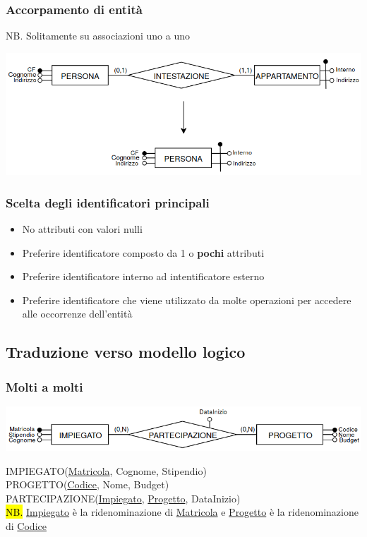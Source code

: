 \documentclass[a4paper]{article}
\begin{document}
\subsubsection{Accorpamento di entità}
NB. Solitamente su associazioni uno a uno
\begin{center}
      \includegraphics[scale=0.44]{img/pl7.png}
\end{center}

\subsubsection{Scelta degli identificatori principali}
\begin{itemize}[noitemsep]
  \item No attributi con valori nulli
  \item Preferire identificatore composto da 1 o \textbf{pochi} attributi
  \item Preferire identificatore interno ad intentificatore esterno
  \item Preferire identificatore che viene utilizzato da molte operazioni per accedere alle occorrenze dell'entità
\end{itemize}

\subsection{Traduzione verso modello logico}
\subsubsection{Molti a molti}
\begin{center}
      \includegraphics[scale=0.44]{img/pl8.png}
\end{center}
%
IMPIEGATO(\underline{Matricola}, Cognome, Stipendio)\\
PROGETTO(\underline{Codice}, Nome, Budget)\\
PARTECIPAZIONE(\underline{Impiegato}, \underline{Progetto}, DataInizio)\medskip\\
%
\hl{NB.} \underline{Impiegato} è la ridenominazione di \underline{Matricola} e \underline{Progetto} è la ridenominazione di \underline{Codice}
\end{document}

